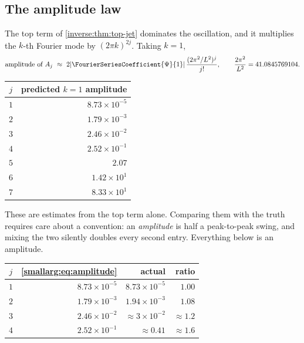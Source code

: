 \documentclass[11pt,oneside]{article}
\theoremstyle{definition}
\theoremstyle{remark}
\begin{document}
\subsection{The amplitude law}

The top term of \cref{inverse:thm:top-jet} dominates the oscillation, and it multiplies
the $k$-th Fourier mode by $(2\pi k)^{2j}$.  Taking $k=1$,
\begin{equation}\label{smallarg:eq:amplitude}
  \text{amplitude of }A_j\ \approx\
  2|\FourierSeriesCoefficient{\Psi}{1}|\,\frac{(2\pi^2/L^2)^j}{j!},
  \qquad \frac{2\pi^2}{L^2}=41.0845769104 .
\end{equation}

\begin{center}
\begin{tabular}{@{}cr@{}}
\toprule
$j$ & predicted $k=1$ amplitude\\
\midrule
$1$ & $8.73\times10^{-5}$\\
$2$ & $1.79\times10^{-3}$\\
$3$ & $2.46\times10^{-2}$\\
$4$ & $2.52\times10^{-1}$\\
$5$ & $2.07$\\
$6$ & $1.42\times10^{1}$\\
$7$ & $8.33\times10^{1}$\\
\bottomrule
\end{tabular}
\end{center}

These are estimates from the top term alone.  Comparing them with the truth
requires care about a convention: an \emph{amplitude} is half a
peak-to-peak swing, and mixing the two silently doubles every second
entry.  Everything below is an amplitude.

\begin{center}
\begin{tabular}{@{}crrr@{}}
\toprule
$j$ & \cref{smallarg:eq:amplitude} & actual & ratio\\
\midrule
$1$ & $8.73\times10^{-5}$ & $8.73\times10^{-5}$ & $1.00$\\
$2$ & $1.79\times10^{-3}$ & $1.94\times10^{-3}$ & $1.08$\\
$3$ & $2.46\times10^{-2}$ & $\approx3\times10^{-2}$ & $\approx1.2$\\
$4$ & $2.52\times10^{-1}$ & $\approx0.41$ & $\approx1.6$\\
\bottomrule
\end{tabular}
\end{center}
\end{document}
